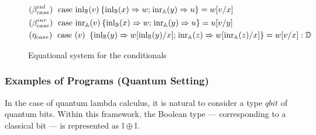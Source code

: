\documentclass[10pt,a4paper]{amsart}
\theoremstyle{definition}
\theoremstyle{definition}
\theoremstyle{definition}
\theoremstyle{definition}
\theoremstyle{definition}
\theoremstyle{definition}
\begin{document}
  \begin{figure}[h!]
    \centering
    \begin{tcolorbox}[colframe=black, colback=white, boxrule=0.6pt, arc=1pt,boxsep=1pt,top=1pt,bottom=1pt, width=0.85 \textwidth]
    \begin{equation*}
        \begin{split}
          &(\beta_{case}^{inl}) \hspace{3pt} \text{ case } 
          \mathrm{inl}_{\mathbb{B}}(v) \hspace{2pt} \{ \mathrm{inl}_{\mathbb{B}} (x) \Rightarrow w 
          ; \hspace{1pt} \mathrm{inr}_{\mathbb{A}} (y) 
          \Rightarrow u\}= w[v/x]
          \\
          &(\beta_{case}^{inr}) \hspace{3pt} \text{ case } 
          \mathrm{inr}_{\mathbb{A}}(v) \hspace{2pt} \{ \mathrm{inl}_{\mathbb{B}} (x) \Rightarrow w 
          ; \hspace{1pt} \mathrm{inr}_{\mathbb{A}} (y) 
          \Rightarrow u\}= u[v/y]
          \\
          & (\eta_{case}) \hspace{3pt} \text{ case }(v)\ \hspace{2pt} \{\text{inl}_{\mathbb{B}} (y) \Rightarrow w [ \text{inl}_{\mathbb{B}}(y)/x] ; \hspace{1pt} \text{inr}_{\mathbb{A}} (z) \Rightarrow w [ \text{inr}_{\mathbb{A}}(z)/x]\} = w[v/x] : \mathbb{D}
        \end{split}
    \end{equation*}
    \end{tcolorbox}
    \caption{Equational system for the conditionals}
    \label{fig:equations-in-context-cond}
    \end{figure}


    \subsubsection{Examples of Programs (Quantum Setting)}

    \par\vspace{10pt} 
    
    
    In the case of quantum lambda calculus, it is natural to consider a  type $\textit{qbit}$ of quantum bits. Within this framework, the Boolean type — corresponding to a classical bit — is represented as $\mathbb{I} \oplus \mathbb{I}$.
    
\end{document}
